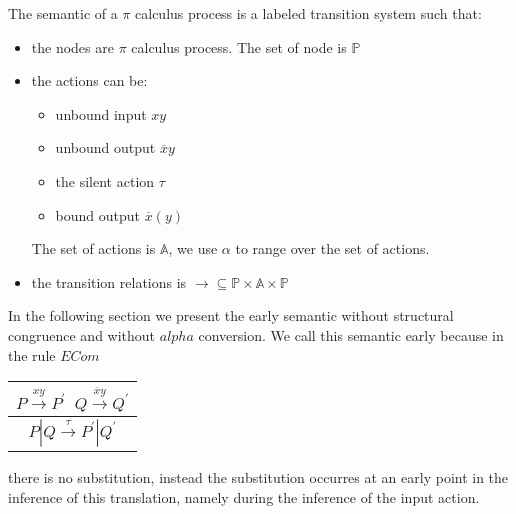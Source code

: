 The semantic of a $\pi$ calculus process is a labeled transition system such that:
\begin{itemize}
  \item 
    the nodes are $\pi$ calculus process. The set of node is $\mathbb{P}$
  \item
    the actions can be:
    \begin{itemize}
      \item unbound input $xy$
      \item unbound output $\overline{x}y$
      \item the silent action $\tau$
      \item bound output $\overline{x}(y)$
    \end{itemize}
    The set of actions is $\mathbb{A}$, we use $\alpha$ to range over the set of actions.
  \item
    the transition relations is $\rightarrow\subseteq \mathbb{P}\times \mathbb{A}\times \mathbb{P}$
\end{itemize}
In the following section we present the early semantic without structural congruence and without $alpha$ conversion. We call this semantic early because in the rule $ECom$
\begin{center}
  \begin{tabular}{c}
    $P \xrightarrow{xy} P^{'}\;\; Q\xrightarrow{\overline{x}y} Q^{'}$\\
    \hline
    $P|Q \xrightarrow{\tau} P^{'}|Q^{'}$
  \end{tabular}
\end{center}
there is no substitution, instead the substitution occurres at an early point in the inference of this translation, namely during the inference of the input action. 

